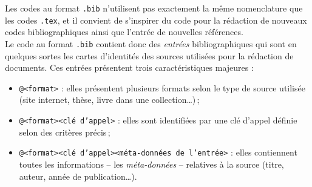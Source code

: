 \documentclass[a4paper, 11pt, twoside, fleqn]{memoir}
\begin{document}
Les codes au format \texttt{.bib} n'utilisent pas exactement la même nomenclature que les codes \texttt{.tex}, et il convient de s'inspirer du code  pour la rédaction de nouveaux codes bibliographiques ainsi que l'entrée de nouvelles références.\\ Le code au format \texttt{.bib} contient donc des \emph{entrées} bibliographiques qui sont en quelques sortes les \og cartes d'identités \fg{} des sources utilisées pour la rédaction de documents. Ces entrées présentent trois caractéristiques majeures :
\begin{itemize}
\item \texttt{@<format>} : elles présentent plusieurs formats selon le type de source utilisée (site internet, thèse, livre dans une collection\ldots)\,;
\item \texttt{@<format>{<clé d'appel>}} : elles sont identifiées par une clé d'appel définie selon des critères précis\,;
\item \texttt{@<format>{<clé d'appel>}{<méta-données de l'entrée>}} : elles contiennent toutes les informations -- les \emph{méta-données} -- relatives à la source (titre, auteur, année de publication\ldots).
\end{itemize}
\end{document}
